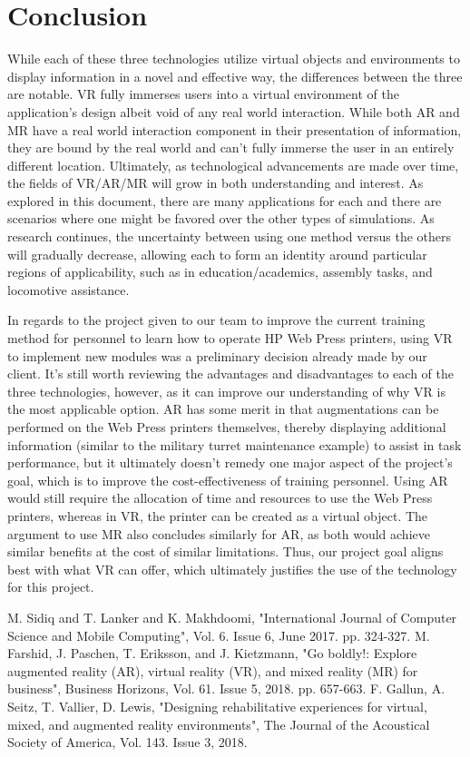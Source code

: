 \documentclass[onecolumn, draftclsnofoot,10pt, compsoc]{IEEEtran}
\begin{document}
\section{Conclusion}
    While each of these three technologies utilize virtual objects and environments to display information in a novel and effective way, the differences between the three are notable. VR fully immerses users into a virtual environment of the application's design albeit void of any real world interaction. While both AR and MR have a real world interaction component in their presentation of information, they are bound by the real world and can't fully immerse the user in an entirely different location. 
    Ultimately, as technological advancements are made over time, the fields of VR/AR/MR will grow in both understanding and interest. As explored in this document, there are many applications for each and there are scenarios where one might be favored over the other types of simulations. As research continues, the uncertainty between using one method versus the others will gradually decrease, allowing each to form an identity around particular regions of applicability, such as in education/academics, assembly tasks, and locomotive assistance. 
    
    In regards to the project given to our team to improve the current training method for personnel to learn how to operate HP Web Press printers, using VR to implement new modules was a preliminary decision already made by our client. It's still worth reviewing the advantages and disadvantages to each of the three technologies, however, as it can improve our understanding of why VR is the most applicable option. AR has some merit in that augmentations can be performed on the Web Press printers themselves, thereby displaying additional information (similar to the military turret maintenance example) to assist in task performance, but it ultimately doesn't remedy one major aspect of the project's goal, which is to improve the cost-effectiveness of training personnel. Using AR would still require the allocation of time and resources to use the Web Press printers, whereas in VR, the printer can be created as a virtual object. The argument to use MR also concludes similarly for AR, as both would achieve similar benefits at the cost of similar limitations. Thus, our project goal aligns best with what VR can offer, which ultimately justifies the use of the technology for this project. 

\clearpage

\begin{thebibliography}{}
M. Sidiq and T. Lanker and K. Makhdoomi, "International Journal of Computer Science and Mobile Computing", Vol. 6. Issue 6, June 2017. pp. 324-327.
M. Farshid, J. Paschen, T. Eriksson, and J. Kietzmann, "Go boldly!: Explore augmented reality (AR), virtual reality (VR), and mixed reality (MR) for business", Business Horizons, Vol. 61. Issue 5, 2018. pp. 657-663.
F. Gallun, A. Seitz, T. Vallier, D. Lewis,  "Designing rehabilitative experiences for virtual, mixed, and augmented reality environments", The Journal of the Acoustical Society of America, Vol. 143. Issue 3, 2018.
\end{thebibliography}
\end{document}

